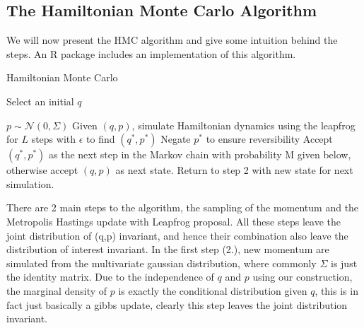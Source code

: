 \documentclass[11pt]{article}
\begin{document}



\pagebreak
\subsection{The Hamiltonian Monte Carlo Algorithm}
We will now present the HMC algorithm and give some intuition behind the steps. An R package includes an implementation of this algorithm.
\begin{algorithm}
\caption{Hamiltonian Monte Carlo}\label{euclid}
\begin{algorithmic}[1] 
\State Select an initial $q$ 

\State $p\sim \mathcal{N}(0,\Sigma)$
\State Given $(q,p)$, simulate Hamiltonian dynamics using the leapfrog for $L$ steps with $\epsilon$ to find $(q^{*},p^{*})$ 
\State Negate $p^{*}$ to ensure reversibility 
\State Accept $(q^{*}, p^{*})$ as the next step in the Markov chain with probability M given below, otherwise accept $(q,p)$ as next state.
\State Return to step 2 with new state for next simulation.
\end{algorithmic}
\end{algorithm}
\noindent There are 2 main steps to the algorithm, the sampling of the momentum and the Metropolis Hastings update with Leapfrog proposal. All these steps leave the joint distribution of (q,p) invariant, and hence their combination also leave the distribution of interest invariant. In the first step (2.), new momentum are simulated from the multivariate gaussian distribution, where commonly $\Sigma$ is just the identity matrix. Due to the independence of $q$ and $p$ using our construction, the marginal density of $p$ is exactly the conditional distribution given $q$, this is in fact just basically a gibbs update, clearly this step leaves the joint distribution invariant. 
\\
\\
\end{document}
